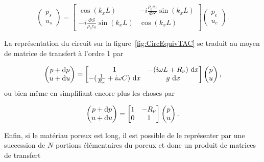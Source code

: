 \begin{equation}
\begin{pmatrix}
p_s\\
u_s
\end{pmatrix} = \begin{bmatrix}
\cos(k_x L) & -i\frac{\rho_0 c_0}{\Phi S}\sin(k_x L)\\
-i\frac{\Phi S}{\rho_0 c_0}\sin(k_x L) & \cos(k_x L)
\end{bmatrix}
\begin{pmatrix}
p_e\\
u_e
\end{pmatrix}.\label{eq:Tmatrix_poreux}
\end{equation}


La représentation du circuit sur la figure~\ref{fig:CircEquivTAC} se traduit au moyen de matrice de transfert à l'ordre 1 par 


\begin{equation}
	\begin{pmatrix}
		p + \mathrm{d} p\\
		u + \mathrm{d} u
	\end{pmatrix} = \begin{bmatrix}
	1 & -(i\omega L + R_\nu)~\mathrm{d} x  \\
	-(\frac{1}{R_\kappa} + i \omega C)~\mathrm{d} x & g~\mathrm{d} x \end{bmatrix} \begin{pmatrix}
	p \\
	u
	\end{pmatrix}, \label{eq:TMatrix_NoyauTA}
\end{equation}
ou bien même en simplifiant encore plus les choses par

\begin{equation}
    \begin{pmatrix}
        p + \mathrm{d} p \\
        u + \mathrm{d} u
    \end{pmatrix} = \begin{bmatrix}
    1 & -R_\nu \\
    0 & 1
    \end{bmatrix}\begin{pmatrix}
        p \\
        u
    \end{pmatrix}.
    \label{eq:Tmatrix_NoyauTA_simplifie}
\end{equation}

Enfin, si le matériau poreux est long, il est possible de le représenter par une succession de $N$ portions élémentaires du poreux et donc un produit de matrices de transfert

